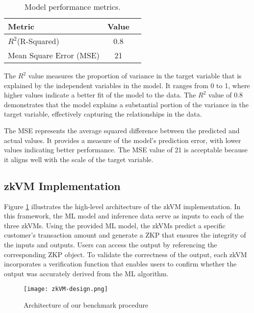 \documentclass{scrartcl}
\begin{document}
\begin{table}[!ht]
	\centering
	\begin{tabular}{|l|c|p{8cm}|}
		\hline
		\textbf{Metric}         & \textbf{Value} \\
		\hline
		\( R^2 \)(R-Squared)    & 0.8            \\
		\hline
		Mean Square Error (MSE) & 21             \\
		\hline
	\end{tabular}
	\caption{Model performance metrics.}
	\label{tab:model-performance}
\end{table}

The \(R^2\) value measures the proportion of variance in the target variable that is explained by the independent variables in the model. It ranges from 0 to 1, where higher values indicate a better fit of the model to the data. The \(R^2\) value of 0.8 demonstrates that the model explains a substantial portion of the variance in the target variable, effectively capturing the relationships in the data.

The MSE represents the average squared difference between the predicted and actual values. It provides a measure of the model's prediction error, with lower values indicating better performance. The MSE value of 21 is acceptable because it aligns well with the scale of the target variable.

\subsection{zkVM Implementation}

Figure \ref{fig:architecture} illustrates the high-level architecture of the zkVM implementation. In this framework, the ML model and inference data serve as inputs to each of the three zkVMs. Using the provided ML model, the zkVMs predict a specific customer’s transaction amount and generate a ZKP that ensures the integrity of the inputs and outputs. Users can access the output by referencing the corresponding ZKP object. To validate the correctness of the output, each zkVM incorporates a verification function that enables users to confirm whether the output was accurately derived from the ML algorithm.

\begin{figure}[H]
	\begin{center}
		\texttt{[image: zkVM-design.png]}
	\end{center}
	\caption{Architecture of our benchmark procedure}
	\label{fig:architecture}
\end{figure}
\end{document}
